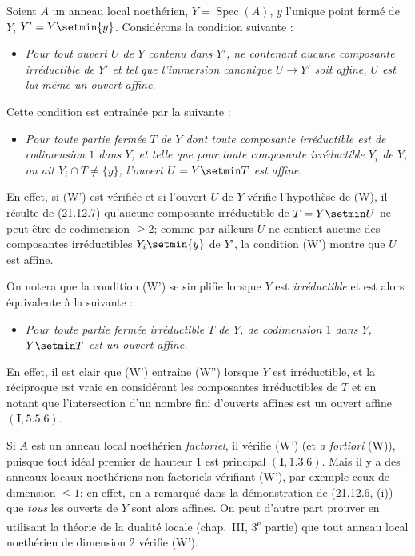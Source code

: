 \begin{env}[21.12.8]
\label{IV.21.12.8}
Soient $A$ un anneau local noethérien, $Y=\operatorname{Spec}(A)$, $y$ l'unique point
fermé de $Y$, $Y'=Y\setmin\{y\}$. Considérons la condition suivante :
\begin{itemize}
  \item[\textup{(W)}] \emph{Pour tout ouvert $U$ de $Y$ contenu dans $Y'$, ne
  contenant aucune composante irréductible de $Y'$ et tel que l'immersion canonique
  $U\to Y'$ soit affine, $U$ est lui-même un ouvert affine.}
\end{itemize}

Cette condition est entraînée par la suivante :
\begin{itemize}
  \item[\textup{(W')}] \emph{Pour toute partie fermée $T$ de $Y$ dont toute composante
  irréductible est de codimension $1$ dans $Y$, et telle que pour toute composante
  irréductible $Y_i$ de $Y$, on ait $Y_i\cap T\ne\{y\}$, l'ouvert $U=Y\setmin T$ est affine.}
\end{itemize}

En effet, si (W') est vérifiée et si l'ouvert $U$ de $Y$ vérifie l'hypothèse de (W), il
résulte de (21.12.7) qu'aucune composante irréductible de $T=Y\setmin U$ ne peut être de
codimension $\geq2$; comme par ailleurs $U$ ne contient aucune des composantes
irréductibles $Y_i\setmin\{y\}$ de $Y'$, la condition (W') montre que $U$ est affine.

On notera que la condition (W') se simplifie lorsque $Y$ est \emph{irréductible} et est
alors équivalente à la suivante :
\begin{itemize}
  \item[\textup{(W'')}] \emph{Pour toute partie fermée irréductible $T$ de $Y$, de
  codimension $1$ dans $Y$, $Y\setmin T$ est un ouvert affine.}
\end{itemize}

En effet, il est clair que (W') entraîne (W'') lorsque $Y$ est irréductible, et la
réciproque est vraie en considérant les composantes irréductibles de $T$ et en notant
que l'intersection d'un nombre fini d'ouverts affines est un ouvert affine
$(\mathbf I, 5.5.6)$.
\end{env}

\begin{examples}[21.12.9]
\label{IV.21.12.9}
Si $A$ est un anneau local noethérien \emph{factoriel}, il vérifie (W') (et
\emph{a fortiori} (W)), puisque tout idéal premier de hauteur $1$ est principal
$(\mathbf I, 1.3.6)$. Mais il y a des anneaux locaux noethériens non factoriels
vérifiant (W'), par exemple ceux de dimension $\leq1$: en effet, on a remarqué dans la
démonstration de (21.12.6, (i)) que \emph{tous} les ouverts de $Y$ sont alors affines.
On peut d'autre part prouver en utilisant la théorie de la dualité locale (chap.~III,
3\textsuperscript{e} partie) que tout anneau local noethérien de dimension $2$ vérifie
(W').
\end{examples}

